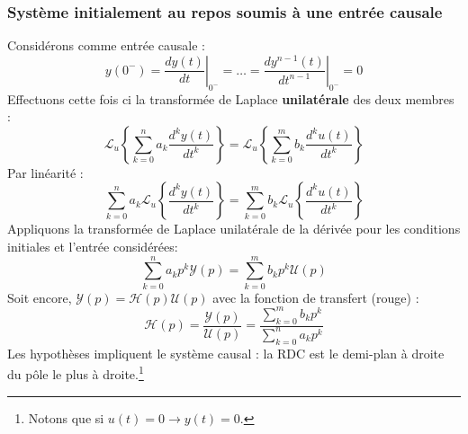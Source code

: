 		\subsubsection{Système initialement au repos soumis à une entrée causale}
		Considérons comme entrée causale :
		\begin{equation}
		y(0^-) = \left.\frac{dy(t)}{dt}\right|_{0^-} = \dots = \left.\frac{dy^{n-1}(t)}{dt^{n-1}}
		\right|_{0^-} = 0
		\end{equation}
		Effectuons cette fois ci la transformée de Laplace \textbf{unilatérale} des deux membres :
		\begin{equation}
		\mathcal{L}_u\left\{\sum_{k=0}^n a_k\dfrac{d^ky(t)}{dt^k}\right\} =	\mathcal{L}_u\left\{
		\sum_{k=0}^m b_k\dfrac{d^ku(t)}{dt^k}\right\}
		\end{equation}
		Par linéarité :
		\begin{equation}
		\sum_{k=0}^n a_k\mathcal{L}_u\left\{\dfrac{d^ky(t)}{dt^k}\right\} =	\sum_{k=0}^m b_k
		\mathcal{L}_u\left\{\dfrac{d^ku(t)}{dt^k}\right\}
		\end{equation}
		Appliquons la transformée de Laplace unilatérale de la dérivée pour les conditions initiales 
		et l’entrée considérées:
		\begin{equation}
		\sum_{k=0}^n a_kp^k\mathcal{Y}(p) = \sum_{k=0}^m b_kp^k\mathcal{U}(p)
		\end{equation}
		Soit encore, $\mathcal{Y}(p) = \mathcal{H}(p)\mathcal{U}(p)$ avec la fonction de transfert 
		(rouge) :
		\begin{equation}
		\mathcal{H}(p) = \frac{\mathcal{Y}(p)}{\mathcal{U}(p)} = \frac{\sum_{k=0}^m b_kp^k}{\sum_{k=0}^n
		 a_kp^k}
		\end{equation}
		Les hypothèses impliquent le système causal : la RDC est le demi-plan à droite du pôle le
		plus à droite.\footnote{Notons que si $u(t) = 0 \rightarrow y(t) =0$.}
	
	
